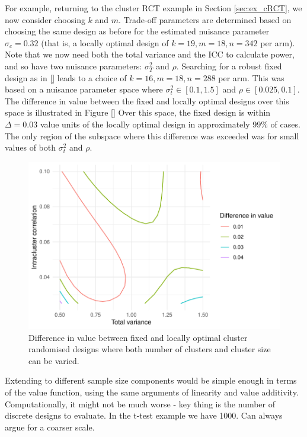 \documentclass[sagev, Crown]{sagej}
\begin{document}
For example, returning to the cluster RCT example in Section \ref{sec:ex_cRCT}, we now consider choosing $k$ and $m$. Trade-off parameters are determined based on choosing the same design as before for the estimated nuisance parameter $\sigma_c = 0.32$ (that is, a locally optimal design of $k =19, m=18, n=342$ per arm). Note that we now need both the total variance and the ICC to calculate power, and so have two nuisance parameters: $\sigma_T^2$ and $\rho$. Searching for a robust fixed design as in \ref{} leads to a choice of $k = 16, m = 18, n = 288$ per arm. This was based on a nuisance parameter space where $\sigma_t^2 \in [0.1, 1.5]$ and $\rho \in [0.025, 0.1]$. The difference in value between the fixed and locally optimal designs over this space is illustrated in Figure \ref{} Over this space, the fixed design is within $\Delta = 0.03$ value units of the locally optimal design in approximately 99\% of cases. The only region of the subspace where this difference was exceeded was for small values of both $\sigma_t^2$ and $\rho$.

\begin{figure}
\centering
\includegraphics[scale=0.8]{./figures/mult_design}
\caption{Difference in value between fixed and locally optimal cluster randomised designs where both number of clusters and cluster size can be varied.}
\label{fig:mult_design}
\end{figure}

Extending to different sample size components would be simple enough in terms of the value function, using the same arguments of linearity and value additivity. Computationally, it might not be much worse - key thing is the number of discrete designs to evaluate. In the t-test example we have 1000. Can always argue for a coarser scale.
\end{document}
